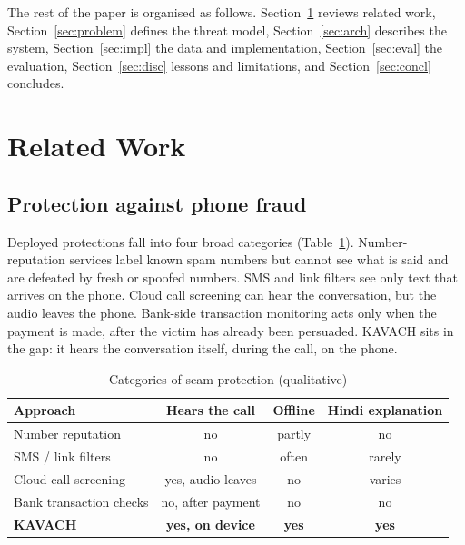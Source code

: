 \documentclass[conference]{IEEEtran}
\begin{document}
The rest of the paper is organised as follows. Section~\ref{sec:related} reviews related work, Section~\ref{sec:problem} defines the threat model, Section~\ref{sec:arch} describes the system, Section~\ref{sec:impl} the data and implementation, Section~\ref{sec:eval} the evaluation, Section~\ref{sec:disc} lessons and limitations, and Section~\ref{sec:concl} concludes.

\section{Related Work}\label{sec:related}

\subsection{Protection against phone fraud}
Deployed protections fall into four broad categories (Table~\ref{tab:approaches}). Number-reputation services label known spam numbers but cannot see what is said and are defeated by fresh or spoofed numbers. SMS and link filters see only text that arrives on the phone. Cloud call screening can hear the conversation, but the audio leaves the phone. Bank-side transaction monitoring acts only when the payment is made, after the victim has already been persuaded. KAVACH sits in the gap: it hears the conversation itself, during the call, on the phone.

\begin{table}[t]
\caption{Categories of scam protection (qualitative)}
\label{tab:approaches}
\centering
\footnotesize
\setlength{\tabcolsep}{3pt}
\begin{tabular}{@{}lccc@{}}
\toprule
Approach & Hears the call & Offline & Hindi explanation \\
\midrule
Number reputation & no & partly & no \\
SMS / link filters & no & often & rarely \\
Cloud call screening & yes, audio leaves & no & varies \\
Bank transaction checks & no, after payment & no & no \\
\textbf{KAVACH} & \textbf{yes, on device} & \textbf{yes} & \textbf{yes} \\
\bottomrule
\end{tabular}
\end{table}
\end{document}
